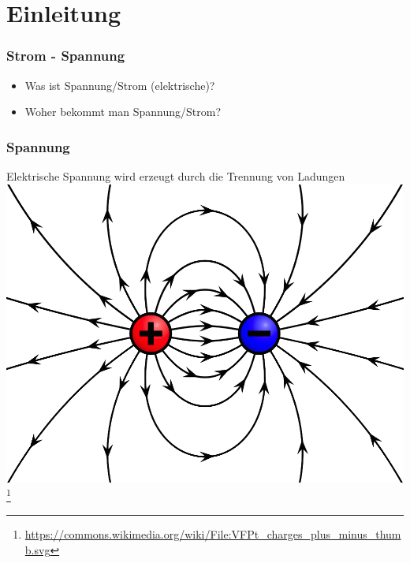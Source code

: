 

\subtitle{Technik 02: \\
          Spannung und Strom, Wechselspannung \\[2em]}
\date{Stand 23.2.2015}



\section*{Einleitung}

\begin{frame}
    \frametitle{Strom - Spannung}
    \begin{itemize}
		\item Was ist Spannung/Strom (elektrische)?
		\item Woher bekommt man Spannung/Strom?
    \end{itemize}
\end{frame}

\begin{frame}
    \frametitle{Spannung}
    \begin{center}
    Elektrische Spannung wird erzeugt durch die Trennung von Ladungen
		\includegraphics[width=.8\textwidth]{e02/ladung.png}
        \footnote{\tiny \url{https://commons.wikimedia.org/wiki/File:VFPt_charges_plus_minus_thumb.svg}}
  	\end{center}
\end{frame}


